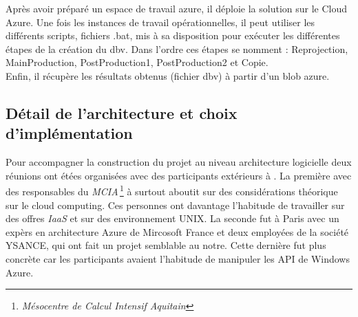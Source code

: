 Après avoir préparé un espace de travail azure, il déploie la solution
sur le Cloud Azure. Une fois les instances de travail opérationnelles,
il peut utiliser les différents scripts, fichiers .bat, mis à sa
disposition pour exécuter les différentes étapes de la création du
dbv. Dans l'ordre ces étapes se nomment : Reprojection, MainProduction,
PostProduction1, PostProduction2 et Copie.\\

Enfin, il récupère les résultats obtenus (fichier dbv) à partir d'un
blob azure.




























%
%


\subsection{Détail de l'architecture et choix d'implémentation}%
Pour accompagner la construction du projet au niveau architecture
logicielle deux réunions ont étées organisées avec des participants
extérieurs à \maxsea. La première avec des responsables du
\textit{MCIA}\,\footnote{\textit{Mésocentre de Calcul Intensif
    Aquitain}} à surtout aboutit sur des considérations théorique sur
le cloud computing. Ces personnes ont davantage l'habitude de
travailler sur des offres \textit{IaaS} et sur des environnement
UNIX. La seconde fut à Paris avec un expèrs en architecture Azure de
Mircosoft France et deux employées de la société YSANCE, qui ont fait
un projet semblable au notre. Cette dernière fut plus concrète car les
participants avaient l'habitude de manipuler les API de Windows
Azure. \\





